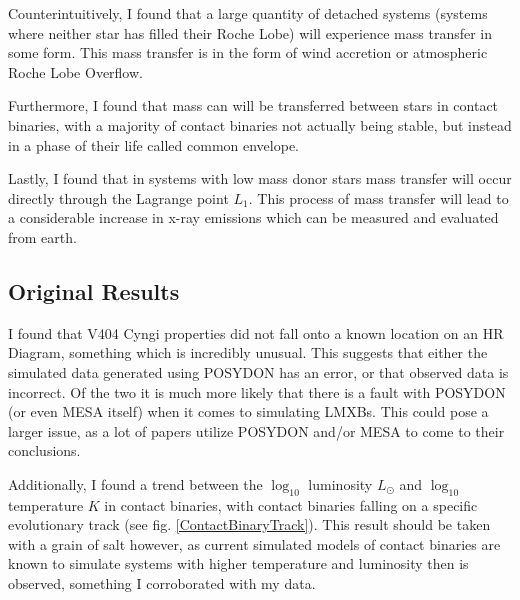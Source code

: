 \documentclass[12pt, a4paper]{article}
\begin{document}
    Counterintuitively, I found that a large quantity of detached systems (systems where neither star has filled their Roche Lobe) will experience mass transfer in some form. This mass transfer is in the form of wind accretion or atmospheric Roche Lobe Overflow.

    Furthermore, I found that mass can will be transferred between stars in contact binaries, with a majority of contact binaries not actually being stable, but instead in a phase of their life called common envelope.

    Lastly, I found that in systems with low mass donor stars mass transfer will occur directly through the Lagrange point $L_1$. This process of mass transfer will lead to a considerable increase in x-ray emissions which can be measured and evaluated from earth.
    
    \subsection{Original Results}
        I found that V404 Cyngi properties did not fall onto a known location on an HR Diagram, something which is incredibly unusual. This suggests that either the simulated data generated using POSYDON has an error, or that observed data is incorrect. Of the two it is much more likely that there is a fault with POSYDON (or even MESA itself) when it comes to simulating LMXBs. This could pose a larger issue, as a lot of papers utilize POSYDON and/or MESA to come to their conclusions. 

        Additionally, I found a trend between the $\log_{10}$ luminosity $L_{\odot}$ and $\log_{10}$ temperature $K$ in contact binaries, with contact binaries falling on a specific evolutionary track (see fig. \ref{ContactBinaryTrack}). This result should be taken with a grain of salt however, as current simulated models of contact binaries are known to simulate systems with higher temperature and luminosity then is observed, something I corroborated with my data.
\end{document}
